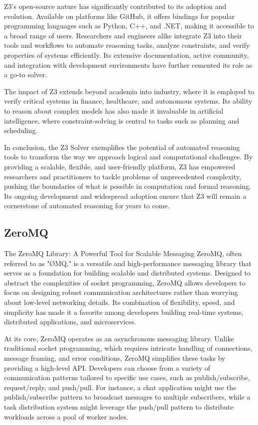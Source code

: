 Z3’s open-source nature has significantly contributed to its adoption and evolution. Available on platforms like GitHub, it offers bindings for popular programming languages such as Python, C++, and .NET, making it accessible to a broad range of users. Researchers and engineers alike integrate Z3 into their tools and workflows to automate reasoning tasks, analyze constraints, and verify properties of systems efficiently. Its extensive documentation, active community, and integration with development environments have further cemented its role as a go-to solver.

The impact of Z3 extends beyond academia into industry, where it is employed to verify critical systems in finance, healthcare, and autonomous systems. Its ability to reason about complex models has also made it invaluable in artificial intelligence, where constraint-solving is central to tasks such as planning and scheduling.

In conclusion, the Z3 Solver exemplifies the potential of automated reasoning tools to transform the way we approach logical and computational challenges. By providing a scalable, flexible, and user-friendly platform, Z3 has empowered researchers and practitioners to tackle problems of unprecedented complexity, pushing the boundaries of what is possible in computation and formal reasoning. Its ongoing development and widespread adoption ensure that Z3 will remain a cornerstone of automated reasoning for years to come.




\subsection{ZeroMQ}
\cite{hintjens2013zeromq} \cite{sustrik2015zeromq}

The ZeroMQ Library: A Powerful Tool for Scalable Messaging
ZeroMQ, often referred to as "ØMQ," is a versatile and high-performance messaging library that serves as a foundation for building scalable and distributed systems. Designed to abstract the complexities of socket programming, ZeroMQ allows developers to focus on designing robust communication architectures rather than worrying about low-level networking details. Its combination of flexibility, speed, and simplicity has made it a favorite among developers building real-time systems, distributed applications, and microservices.

At its core, ZeroMQ operates as an asynchronous messaging library. Unlike traditional socket programming, which requires intricate handling of connections, message framing, and error conditions, ZeroMQ simplifies these tasks by providing a high-level API. Developers can choose from a variety of communication patterns tailored to specific use cases, such as publish/subscribe, request/reply, and push/pull. For instance, a chat application might use the publish/subscribe pattern to broadcast messages to multiple subscribers, while a task distribution system might leverage the push/pull pattern to distribute workloads across a pool of worker nodes.

